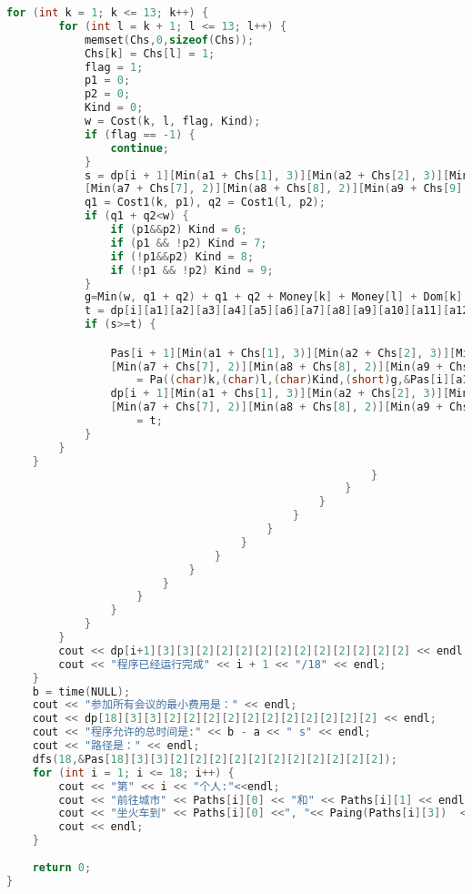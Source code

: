 \begin{lstlisting}[language=C++, numberstyle={\color{black!33}\tiny\sffamily}, basicstyle=\tiny]
	for (int k = 1; k <= 13; k++) {
		for (int l = k + 1; l <= 13; l++) {
			memset(Chs,0,sizeof(Chs));
			Chs[k] = Chs[l] = 1;
			flag = 1;
			p1 = 0;
			p2 = 0;
			Kind = 0;
			w = Cost(k, l, flag, Kind);
			if (flag == -1) {
				continue;
			}
			s = dp[i + 1][Min(a1 + Chs[1], 3)][Min(a2 + Chs[2], 3)][Min(a3 + Chs[3], 2)][Min(a4 + Chs[4], 2)][Min(a5 + Chs[5], 2)][Min(a6 + Chs[6], 2)]
			[Min(a7 + Chs[7], 2)][Min(a8 + Chs[8], 2)][Min(a9 + Chs[9], 2)][Min(a10 + Chs[10], 2)][Min(a11 + Chs[11], 2)][Min(a12 + Chs[12], 2)][Min(a13 + Chs[13], 2)];
			q1 = Cost1(k, p1), q2 = Cost1(l, p2);
			if (q1 + q2<w) {
				if (p1&&p2) Kind = 6;
				if (p1 && !p2) Kind = 7;
				if (!p1&&p2) Kind = 8;
				if (!p1 && !p2) Kind = 9;
			}
			g=Min(w, q1 + q2) + q1 + q2 + Money[k] + Money[l] + Dom[k] * (Nodes[k].End - Nodes[k].Beg) + Dom[l] * (Nodes[l].End - Nodes[l].Beg);
			t = dp[i][a1][a2][a3][a4][a5][a6][a7][a8][a9][a10][a11][a12][a13] + g;
			if (s>=t) {

				Pas[i + 1][Min(a1 + Chs[1], 3)][Min(a2 + Chs[2], 3)][Min(a3 + Chs[3], 2)][Min(a4 + Chs[4], 2)][Min(a5 + Chs[5], 2)][Min(a6 + Chs[6], 2)]
				[Min(a7 + Chs[7], 2)][Min(a8 + Chs[8], 2)][Min(a9 + Chs[9], 2)][Min(a10 + Chs[10], 2)][Min(a11 + Chs[11], 2)][Min(a12 + Chs[12], 2)][Min(a13 + Chs[13], 2)]
					= Pa((char)k,(char)l,(char)Kind,(short)g,&Pas[i][a1][a2][a3][a4][a5][a6][a7][a8][a9][a10][a11][a12][a13]);
				dp[i + 1][Min(a1 + Chs[1], 3)][Min(a2 + Chs[2], 3)][Min(a3 + Chs[3], 2)][Min(a4 + Chs[4], 2)][Min(a5 + Chs[5], 2)][Min(a6 + Chs[6], 2)]
				[Min(a7 + Chs[7], 2)][Min(a8 + Chs[8], 2)][Min(a9 + Chs[9], 2)][Min(a10 + Chs[10], 2)][Min(a11 + Chs[11], 2)][Min(a12 + Chs[12], 2)][Min(a13 + Chs[13], 2)]
					= t;
			}
		}
	}
														}
													}
												}
											}
										}
									}
								}
							}
						}
					}
				}
			}
		}
		cout << dp[i+1][3][3][2][2][2][2][2][2][2][2][2][2][2] << endl;
		cout << "程序已经运行完成" << i + 1 << "/18" << endl;
	}
	b = time(NULL);
	cout << "参加所有会议的最小费用是：" << endl;
	cout << dp[18][3][3][2][2][2][2][2][2][2][2][2][2][2] << endl;
	cout << "程序允许的总时间是:" << b - a << " s" << endl;
	cout << "路径是：" << endl;
	dfs(18,&Pas[18][3][3][2][2][2][2][2][2][2][2][2][2][2]);
	for (int i = 1; i <= 18; i++) {
		cout << "第" << i << "个人:"<<endl;
		cout << "前往城市" << Paths[i][0] << "和" << Paths[i][1] << endl;
		cout << "坐火车到" << Paths[i][0] <<", "<< Paing(Paths[i][3])  << Paths[i][1] << "  ,花费" << Paths[i][2] << "元" << endl;
		cout << endl;
	}
	
	return 0;
}

\end{lstlisting}
